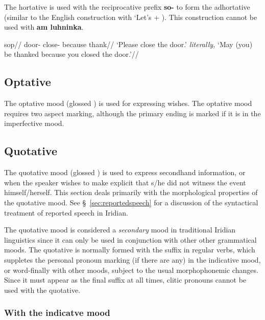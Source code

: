\par The hortative is used with the reciprocative prefix \textbf{so-} to form the adhortative (similar to the English construction with `Let's + ). This construction cannot be used with \textbf{am luhninka}.

\pex
\begingl
\gla sop//
\glb door- close-  because thank//
\glft  `Please close the door.' \textit{literally,} `May (you) be thanked because you closed the door.'//
\endgl
\xe

\subsection{Optative}
The optative mood (glossed ) is used for expressing wishes. The optative mood requires two aspect marking, although the primary ending is marked if it is in the imperfective mood.



\subsection{Quotative}\label{sec:quotative}
\par The quotative mood (glossed ) is used to express secondhand information, or when the speaker wishes to make explicit that s/he did not witness the event himself/herself. This section deals primarily with the morphological properties of the quotative mood. See \S~\ref{sec:reportedspeech} for a discussion of the syntactical treatment of reported speech in Iridian.

The quotative mood is considered a \emph{secondary} mood in traditional Iridian linguistics since it can only be used in conjunction with other other grammatical moods. The quotative is normally formed with the suffix  in regular verbs, which suppletes the personal pronoun marking (if there are any) in the indicative mood, or word-finally with other moods, subject to the usual morphophonemic changes. Since it must appear as the final suffix at all times, clitic pronouns cannot be used with the quotative.


\subsubsection{With the indicatve mood}

